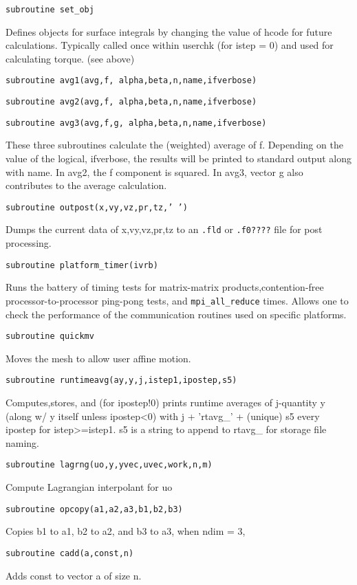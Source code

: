 {\tt subroutine set\_obj}

    Defines objects for surface integrals by changing the value of hcode for future calculations. Typically called once within userchk (for istep = 0) and used for calculating torque. (see above) 
    
{\tt subroutine avg1(avg,f, alpha,beta,n,name,ifverbose)}

{\tt subroutine avg2(avg,f, alpha,beta,n,name,ifverbose)}

{\tt subroutine avg3(avg,f,g, alpha,beta,n,name,ifverbose)}

    These three subroutines calculate the (weighted) average of f. Depending on the value of the logical, ifverbose, the results will be printed to standard output along with name. In avg2, the f component is squared. In avg3, vector g also contributes to the average calculation. 
    
{\tt subroutine outpost(x,vy,vz,pr,tz,' ')}

    Dumps the current data of x,vy,vz,pr,tz to an {\tt .fld} or {\tt .f0????} file for post processing. 
    
{\tt subroutine platform\_timer(ivrb)}

    Runs the battery of timing tests for matrix-matrix products,contention-free processor-to-processor ping-pong tests, and {\tt mpi\_all\_reduce} times. Allows one to check the performance of the communication routines used on specific platforms. 
    
{\tt subroutine quickmv}

    Moves the mesh to allow user affine motion. 
    
{\tt subroutine runtimeavg(ay,y,j,istep1,ipostep,s5)}

    Computes,stores, and (for ipostep!0) prints runtime averages of j-quantity y (along w/ y itself unless ipostep<0) with j + 'rtavg\_' + (unique) s5 every ipostep for istep>=istep1. s5 is a string to append to rtavg\_ for storage file naming. 
    
{\tt subroutine lagrng(uo,y,yvec,uvec,work,n,m)}

    Compute Lagrangian interpolant for uo 
    
{\tt subroutine opcopy(a1,a2,a3,b1,b2,b3)}

    Copies b1 to a1, b2 to a2, and b3 to a3, when ndim = 3, 
    
{\tt subroutine cadd(a,const,n)}

    Adds const to vector a of size n. 
    
